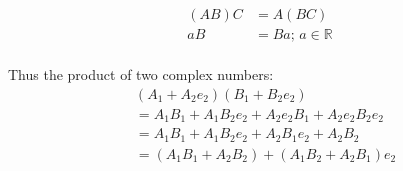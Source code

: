 \documentclass[twoside]{article}
\begin{document}
\begin{multicols*}{2}
$$\begin{aligned}
                    (AB)C &= A(BC) \\
                    aB &= Ba;\, a \in \mathbb{R} \\
                \end{aligned}$$
            \vfill\null\columnbreak
            \par
                Thus the product of two complex numbers: \\
                $$\begin{aligned}
                    & (A_1 + A_2 e_2)(B_1 + B_2 e_2) \\
                    & = A_1 B_1 + A_1 B_2 e_2 + A_2 e_2 B_1 + A_2 e_2 B_2 e_2 \\
                    & = A_1 B_1 + A_1 B_2 e_2 + A_2 B_1 e_2 + A_2 B_2 \\
                    & = (A_1 B_1 + A_2 B_2) + (A_1 B_2 + A_2 B_1) e_2 \\
                \end{aligned}$$

\end{multicols*}
\end{document}
